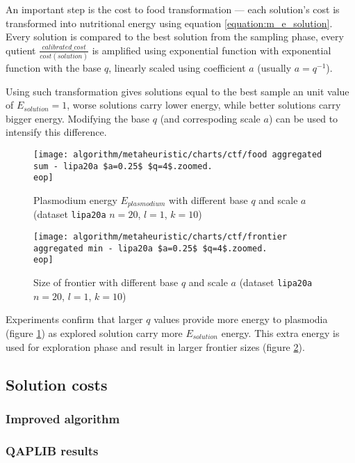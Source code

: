 An important step is the cost to food transformation --- each solution's cost is transformed into nutritional energy using equation \ref{equation:m_e_solution}. Every solution is compared to the best solution from the sampling phase, every qutient $\frac{calibrated\_cost}{cost(solution)}$ is amplified using exponential function with exponential function with the  base $q$, linearly scaled using coefficient $a$ (usually $a=q^{-1}$). 

Using such transformation gives solutions equal to the best sample an unit value of $E_{solution}=1$, worse solutions carry lower energy, while better solutions carry bigger energy. Modifying the base $q$ (and correspoding scale $a$) can be used to intensify this difference.

\begin{figure}
  \centering

  \texttt{[image: algorithm/metaheuristic/charts/ctf/food aggregated sum - lipa20a \$a=0.25\$ \$q=4\$.zoomed.\\eop]}
  
  \caption{Plasmodium energy $E_{plasmodium}$ with different base $q$ and scale $a$ (dataset \texttt{lipa20a} $n=20$, $l=1$, $k=10$)}
  \label{figure:am_ctf_food}
\end{figure}

\begin{figure}
  \centering

  \texttt{[image: algorithm/metaheuristic/charts/ctf/frontier aggregated min - lipa20a \$a=0.25\$ \$q=4\$.zoomed.\\eop]}
  
  \caption{Size of frontier with different base $q$ and scale $a$ (dataset \texttt{lipa20a} $n=20$, $l=1$, $k=10$)}
  \label{figure:am_ctf_frontier}
\end{figure}

Experiments confirm that larger $q$ values provide more energy to plasmodia (figure \ref{figure:am_ctf_food}) as explored solution carry more $E_{solution}$ energy. This extra energy is used for exploration phase and result in larger frontier sizes (figure \ref{figure:am_ctf_frontier}).


\subsection{Solution costs}


\subsubsection{Improved algorithm}


\subsubsection{QAPLIB results}
